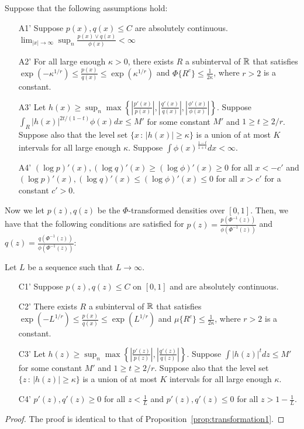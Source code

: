 \begin{proposition}
\label{prop:transformation2}
Suppose that the following assumptions hold:
\begin{enumerate}
\item[A1'] Suppose $p(x), q(x) \leq C$ are absolutely continuous.  $\lim_{|x| \rightarrow \infty} \sup_n \frac{p(x) \vee q(x)}{\phi(x)} < \infty$
\item[A2'] For all large enough $\kappa > 0$, there exists $R$ a subinterval of ${\mathbb R}$ that satisfies $\exp(-\kappa^{1/r}) \leq \frac{p(x)}{q(x)} \leq \exp(\kappa^{1/r})$ and $\Phi \{ R^c \} \leq \frac{1}{2\kappa}$, where $r > 2$ is a constant.
\item[A3'] Let $h(x) \geq \sup_n \max \left\{  \left|\frac{p'(x)}{p(x)} \right|, 
 \left|\frac{q'(x)}{q(x)}\right|, \left| \frac{\phi'(x)}{\phi(x)}\right|  \right\} $. Suppose $\int_R |h(x)|^{2t/(1-t)} \phi(x) dx \leq M'$ for some constant $M'$ and $1 \geq t \geq 2/r$. Suppose also that the level set $\{x \,:\, |h(x)| \geq \kappa\}$ is a union of at most $K$ intervals for all large enough $\kappa$. Suppose $\int \phi(x)^{\frac{1-t}{1+t}} dx < \infty$.
\item[A4']  $(\log p)'(x), (\log q)'(x) \geq (\log \phi)'(x) \geq 0$ for all $x < -c'$ and $ (\log p)'(x), (\log q)'(x) \leq (\log \phi)'(x) \leq 0$ for all $x > c'$ for a constant $c' > 0$.
\end{enumerate}

Now we let $p(z), q(z)$ be the $\Phi$-transformed densities over $[0,1]$.
Then, we have that the following conditions are satisfied for $p(z) = \frac{p(\Phi^{-1}(z))}{\phi(\Phi^{-1}(z))}$ and $q(z) = \frac{q(\Phi^{-1}(z))}{\phi(\Phi^{-1}(z))}$:

Let $L$ be a sequence such that $L \rightarrow \infty$.
\begin{enumerate}
\item[C1'] Suppose $p(z), q(z) \leq C$ on $[0,1]$ and are absolutely continuous.
\item[C2'] There exists $R$ a subinterval of ${\mathbb R}$ that satisfies $\exp(-L^{1/r}) \leq \frac{p(x)}{q(x)} \leq \exp(L^{1/r})$ and $\mu \{ R^c \} \leq \frac{1}{2\kappa}$, where $r > 2$ is a constant.
\item[C3'] Let $h(z) \geq \sup_n \max \left\{  \left|\frac{p'(z)}{p(z)} \right|, 
 \left|\frac{q'(z)}{q(z)}\right|  \right\} $. Suppose $\int |h(z)|^t dz \leq M'$ for some constant $M'$ and $1 \geq t \geq 2/r$. Suppose also that the level set $\{z \,:\, |h(z)| \geq \kappa\}$ is a union of at most $K$ intervals for all large enough $\kappa$.  
\item[C4']  $p'(z), q'(z) \geq 0$ for all $z < \frac{1}{L}$ and $p'(z), q'(z) \leq 0$ for all $z > 1-\frac{1}{L}$. 
\end{enumerate}

\end{proposition}

\begin{proof}

The proof is identical to that of Proposition~\ref{prop:transformation1}.
\end{proof}


